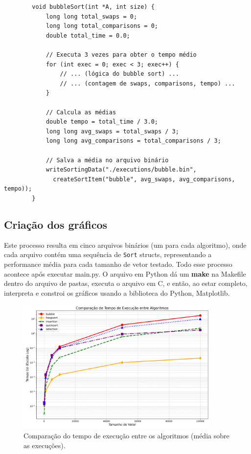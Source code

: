 \documentclass[a4paper]{article}
\begin{document}
    \begin{verbatim}
        void bubbleSort(int *A, int size) {
            long long total_swaps = 0;
            long long total_comparisons = 0;
            double total_time = 0.0;
        
            // Executa 3 vezes para obter o tempo médio
            for (int exec = 0; exec < 3; exec++) {
                // ... (lógica do bubble sort) ...
                // ... (contagem de swaps, comparisons, tempo) ...
            }
        
            // Calcula as médias
            double tempo = total_time / 3.0;
            long long avg_swaps = total_swaps / 3;
            long long avg_comparisons = total_comparisons / 3;
        
            // Salva a média no arquivo binário
            writeSortingData("./executions/bubble.bin", 
              createSortItem("bubble", avg_swaps, avg_comparisons, tempo));
        }
    \end{verbatim}

    \subsection{Criação dos gráficos}\label{subsec:criacao-dos-graficos}
    Este processo resulta em cinco arquivos binários (um para cada algoritmo), onde cada arquivo contém uma sequência de \texttt{Sort} structs, representando a performance média para cada tamanho de vetor testado.
    Todo esse processo acontece após executar main.py.
    O arquivo em Python dá um \textbf{make} na Makefile dentro do arquivo de pastas, executa o arquivo em C, e então, ao estar completo, interpreta e constroi os gráficos usando a biblioteca do Python, Matplotlib.

    \begin{figure}[htbp]
      \centering
      \includegraphics[width=0.9\textwidth]{../../graficos/tempo_comparacao}
      \caption{Comparação do tempo de execução entre os algoritmos (média sobre as execuções).}
      \label{fig:tempo_comparacao}
    \end{figure}
\end{document}
